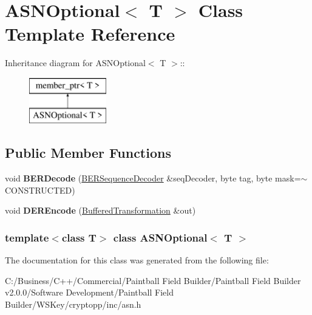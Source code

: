 \hypertarget{class_a_s_n_optional}{
\section{ASNOptional$<$ T $>$ Class Template Reference}
\label{class_a_s_n_optional}
}
Inheritance diagram for ASNOptional$<$ T $>$::\begin{figure}[H]
\begin{center}
\leavevmode
\includegraphics[height=2cm]{class_a_s_n_optional}
\end{center}
\end{figure}
\subsection*{Public Member Functions}
\begin{DoxyCompactItemize}
\item 
\hypertarget{class_a_s_n_optional_a4420b3319618c5e7e84686f1ce19d01d}{
void {\bfseries BERDecode} (\hyperlink{class_b_e_r_sequence_decoder}{BERSequenceDecoder} \&seqDecoder, byte tag, byte mask=$\sim$CONSTRUCTED)}
\label{class_a_s_n_optional_a4420b3319618c5e7e84686f1ce19d01d}

\item 
\hypertarget{class_a_s_n_optional_a36790c38b68ba5a91eafbf5b97bd3c14}{
void {\bfseries DEREncode} (\hyperlink{class_buffered_transformation}{BufferedTransformation} \&out)}
\label{class_a_s_n_optional_a36790c38b68ba5a91eafbf5b97bd3c14}

\end{DoxyCompactItemize}
\subsubsection*{template$<$class T$>$ class ASNOptional$<$ T $>$}



The documentation for this class was generated from the following file:\begin{DoxyCompactItemize}
\item 
C:/Business/C++/Commercial/Paintball Field Builder/Paintball Field Builder v2.0.0/Software Development/Paintball Field Builder/WSKey/cryptopp/inc/asn.h\end{DoxyCompactItemize}
